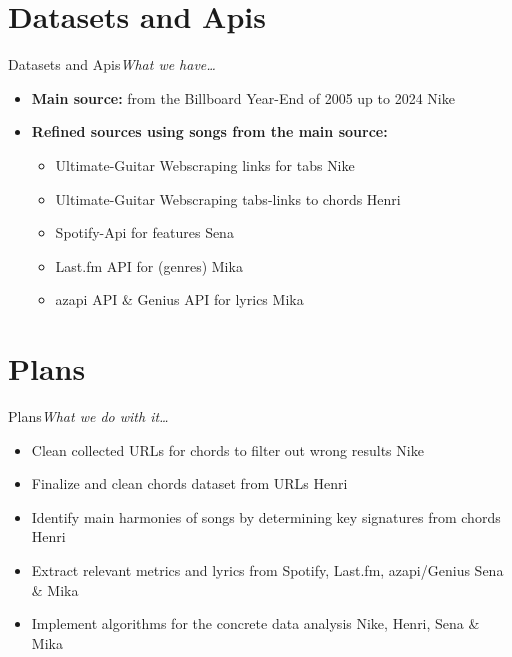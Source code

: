     \section{Datasets and Apis}
    \begin{frame}{Datasets and Apis}{\itshape What we have\dots}
        \begin{itemize}
            \item \textbf{Main source:}  from the Billboard Year-End of 2005 up to 2024 \alert{Nike}
            \item \textbf{Refined sources using songs from the main source:}
                \begin{itemize}
                    \item Ultimate-Guitar Webscraping links for tabs \alert{Nike}
                    \item Ultimate-Guitar Webscraping tabs-links to chords \alert{Henri}
                    \item Spotify-Api for features \alert{Sena}
                    \item Last.fm API for  (genres) \alert{Mika}
                    \item azapi API \& Genius API for lyrics \alert{Mika}
                \end{itemize}
        \end{itemize}
    \end{frame}

    \section{Plans}
    \begin{frame}{Plans}{\it What we do with it\dots}
        \begin{itemize}
            \item Clean collected URLs for chords to filter out wrong results \alert{Nike}
            \item Finalize and clean chords dataset from URLs \alert{Henri}
            \item Identify main harmonies of songs by determining key signatures from chords \alert{Henri}
            \item Extract relevant metrics and lyrics from Spotify, Last.fm, azapi/Genius \alert{Sena \& Mika}
            \item Implement algorithms for the concrete data analysis \alert{Nike, Henri, Sena \& Mika}
        \end{itemize}
    \end{frame}


